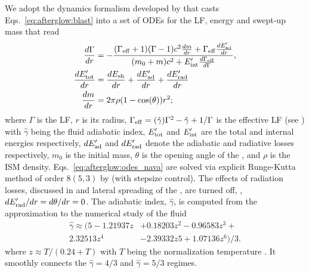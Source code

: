 We adopt the \blast{} dynamics formalism developed by \citet{Nava:2013} that casts 
Eqs.~\eqref{eq:afterglow:blast} into a set of \acp{ODE} for the \blast{} \ac{LF}, 
energy and swept-up mass that read 
%
\begin{subequations}
    \label{eq:afterglow:odes_nava}
    \begin{align}
    \frac{d\Gamma}{dr} &= -\frac{(\Gamma_{\rm eff} + 1)(\Gamma - 1) c^2\frac{dm}{dr} + \Gamma_{\rm eff}\frac{dE'_{\rm ad}}{dr}}{(m_0 + m) c^2 + E'_{\rm int}\frac{d\Gamma_{\rm eff}\rm }{d\Gamma}}, \\
    \frac{dE'_{\rm tot}}{dr} &= \frac{dE_{\rm sh}}{dr} + \frac{dE'_{\rm ad}}{dr} + \frac{dE'_{\rm rad}}{dr} \\
    \frac{dm}{dr} &= 2 \pi \rho (1 - \cos(\theta)) r^2;
    \end{align}
\end{subequations}
%
where $\Gamma$ is the \blast{} \ac{LF}, $r$ is its radius, 
$\Gamma_{\rm eff} = (\hat{\gamma})\Gamma^2-\hat{\gamma}+1 / \Gamma$ is the effective 
\ac{LF} (see \citet{Nava:2013}) 
with $\hat{\gamma}$ being the fluid adiabatic index, 
$E'_{\rm tot}$ and  $E'_{\rm int}$ are the total and internal energies respectively, 
$dE'_{\rm ad}$ and $dE'_{\rm rad}$ denote the adiabatic and radiative losses respectively, 
$m_0$ is the initial mass, 
$\theta$ is the opening angle of the \blast{}, 
and $\rho$ is the \ac{ISM} density.
%
Eqs.~\ref{eq:afterglow:odes_nava} are solved via 
explicit Runge-Kutta method of order $8(5,3)$ by \citet{Dormand:1980} 
(with stepsize control). 
%
The effects of radiation losses, discussed in \citet{Nava:2013} and lateral 
spreading of the \blast{} \citep[\eg][]{Granot:2012}, are turned off,
\ie, $d E'_{\rm rad}/dr = d\theta / dr = 0$.
%
The adiabatic index, $\hat{\gamma}$, is computed from the approximation to the 
numerical study of the \trans{} fluid \citep{Service:1986}
%
\begin{eqnarray}
\hat{\gamma} \approx (5 - 1.21937z &+ 0.18203z^2 - 0.96583z^3 + \\
2.32513z^4 &- 2.39332z 5 + 1.07136z^6)/3.
\end{eqnarray}
% 
where $z \approx T/(0.24 + T)$ with $T$ being the normalization temperature
\citep{Peer:2012}.
%
It smoothly connects the 
$\hat{\gamma}=4/3$ and $\hat{\gamma}=5/3$ regimes. 


